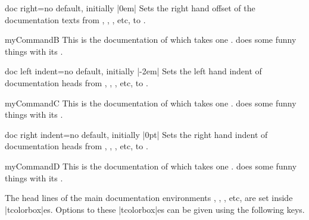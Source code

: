 \begin{docTcbKey}{doc right}{=}{no default, initially |0em|}
  Sets the right hand offset of the documentation texts from
  , , , etc, to .
\begin{dispExample}
\begin{docCommand*}[doc right=2cm]{myCommandB}{}
  This is the documentation of  which takes one .
   does some funny things with its .
\end{docCommand*}
\end{dispExample}
\end{docTcbKey}

\begin{docTcbKey}{doc left indent}{=}{no default, initially |-2em|}
  Sets the left hand indent of documentation heads from
  , , , etc, to .
\begin{dispExample}
\begin{docCommand*}[doc left indent=2cm]{myCommandC}{}
  This is the documentation of  which takes one .
   does some funny things with its .
\end{docCommand*}
\end{dispExample}
\end{docTcbKey}

\enlargethispage*{10mm}
\begin{docTcbKey}{doc right indent}{=}{no default, initially |0pt|}
  Sets the right hand indent of documentation heads from
  , , , etc, to .
\begin{dispExample}
\begin{docCommand*}[doc right indent=-10mm,doc right=10mm,
    doc description=test value]{myCommandD}{}
  This is the documentation of  which takes one .
   does some funny things with its .
\end{docCommand*}
\end{dispExample}
\end{docTcbKey}

\clearpage
The head lines of the main documentation environments ,
, , etc, are set inside |tcolorbox|es.
Options to these |tcolorbox|es can be given using the following keys.

